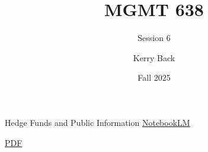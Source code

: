 \documentclass[aspectratio=169]{beamer}
\title{MGMT 638}
\subtitle{Session 6}
\author{Kerry Back}
\institute{}
\date{Fall 2025}
\begin{document}
\maketitle

\begin{frame}{Hedge Funds and Public Information}
\centering
\Large
\href{https://notebooklm.google.com/notebook/93761776-77e8-45ae-a5fa-3010fdf23d65}{NotebookLM}

\vspace{1em}

\href{https://mgmt638.kerryback.com/Crane_Crotty_Umar_MS_2023.pdf}{PDF}
\end{frame}
\end{document}
